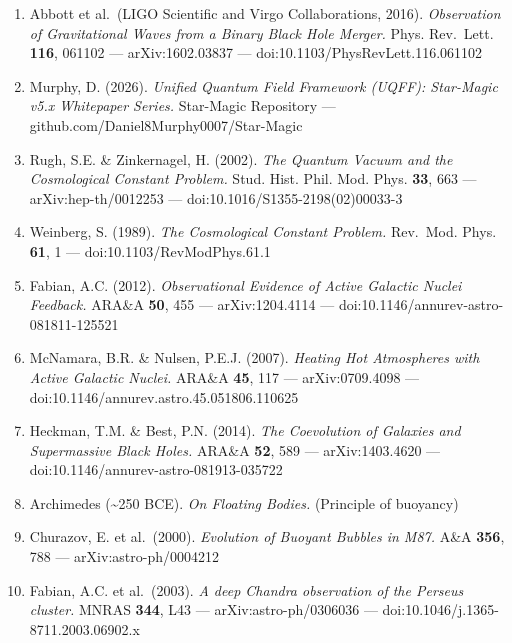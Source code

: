 \begin{enumerate}
\def\labelenumi{\arabic{enumi}.}
\tightlist
\item
  Abbott et al.~(LIGO Scientific and Virgo Collaborations, 2016).
  \emph{Observation of Gravitational Waves from a Binary Black Hole
  Merger.} Phys. Rev.~Lett. \textbf{116}, 061102 --- arXiv:1602.03837
  --- doi:10.1103/PhysRevLett.116.061102
\item
  Murphy, D. (2026). \emph{Unified Quantum Field Framework (UQFF):
  Star-Magic v5.x Whitepaper Series.} Star-Magic Repository ---
  github.com/Daniel8Murphy0007/Star-Magic
\item
  Rugh, S.E. \& Zinkernagel, H. (2002). \emph{The Quantum Vacuum and the
  Cosmological Constant Problem.} Stud. Hist. Phil. Mod. Phys.
  \textbf{33}, 663 --- arXiv:hep-th/0012253 ---
  doi:10.1016/S1355-2198(02)00033-3
\item
  Weinberg, S. (1989). \emph{The Cosmological Constant Problem.}
  Rev.~Mod. Phys. \textbf{61}, 1 --- doi:10.1103/RevModPhys.61.1
\item
  Fabian, A.C. (2012). \emph{Observational Evidence of Active Galactic
  Nuclei Feedback.} ARA\&A \textbf{50}, 455 --- arXiv:1204.4114 ---
  doi:10.1146/annurev-astro-081811-125521
\item
  McNamara, B.R. \& Nulsen, P.E.J. (2007). \emph{Heating Hot Atmospheres
  with Active Galactic Nuclei.} ARA\&A \textbf{45}, 117 ---
  arXiv:0709.4098 --- doi:10.1146/annurev.astro.45.051806.110625
\item
  Heckman, T.M. \& Best, P.N. (2014). \emph{The Coevolution of Galaxies
  and Supermassive Black Holes.} ARA\&A \textbf{52}, 589 ---
  arXiv:1403.4620 --- doi:10.1146/annurev-astro-081913-035722
\item
  Archimedes (\textasciitilde250 BCE). \emph{On Floating Bodies.}
  (Principle of buoyancy)
\item
  Churazov, E. et al.~(2000). \emph{Evolution of Buoyant Bubbles in
  M87.} A\&A \textbf{356}, 788 --- arXiv:astro-ph/0004212
\item
  Fabian, A.C. et al.~(2003). \emph{A deep Chandra observation of the
  Perseus cluster.} MNRAS \textbf{344}, L43 --- arXiv:astro-ph/0306036
  --- doi:10.1046/j.1365-8711.2003.06902.x
\end{enumerate}
